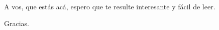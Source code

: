 \thispagestyle{empty}
\null
\vfill
\noindent\begin{minipage}{\textwidth}
    \raggedright
    A vos, que estás acá, espero que te resulte interesante y fácil de leer.

    \medskip
    Gracias.
\end{minipage}
\vfill
\clearpage
